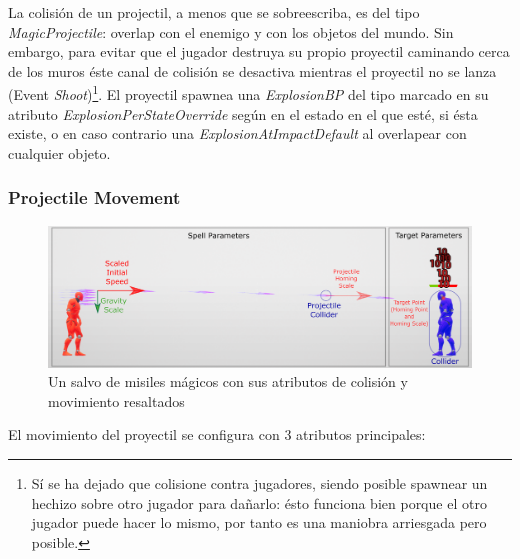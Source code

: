 \documentclass[12pt]{report}
\begin{document}
La colisión de un projectil, a menos que se sobreescriba, es del tipo \textit{MagicProjectile}: overlap con el enemigo y con los objetos del mundo. Sin embargo, para evitar que el jugador destruya su propio proyectil caminando cerca de los muros éste canal de colisión se desactiva mientras el proyectil no se lanza (Event \textit{Shoot})\footnote{Sí se ha dejado que colisione contra jugadores, siendo posible spawnear un hechizo sobre otro jugador para dañarlo: ésto funciona bien porque el otro jugador puede hacer lo mismo, por tanto es una maniobra arriesgada pero posible.}. El proyectil spawnea una \textit{ExplosionBP} del tipo marcado en su atributo \textit{ExplosionPerStateOverride} según en el estado en el que esté, si ésta existe, o en caso contrario una \textit{ExplosionAtImpactDefault} al overlapear con cualquier objeto.

\subsubsection{Projectile Movement}

\begin{figure}[H]
    \centering
    \includegraphics[width=1\textwidth]{projectiles_explained}
	\captionsetup{labelformat=empty}
    \caption{Un salvo de misiles mágicos con sus atributos de colisión y movimiento resaltados}
\end{figure}

El movimiento del proyectil se configura con 3 atributos principales:
\end{document}
